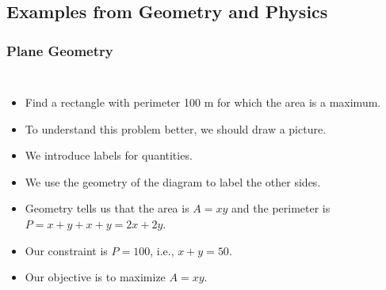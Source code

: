 \documentclass[serif,ignorenonframetext]{beamer}
\begin{document}
\subsection{Examples from Geometry and Physics}

\begin{frame}
  \frametitle{Plane Geometry}
  \begin{columns}
  \begin{itemize}[<+->]
  \item Find a rectangle with perimeter 100 m for which the area is 
    a maximum.
  \item To understand this problem better, we should draw a picture.
  \item We introduce labels for quantities.
  \item We use the geometry of the diagram to label the other sides.
  \item Geometry tells us that the area is
    $A=xy$ and the perimeter is $P=x+y+x+y=2x+2y$.
  \item Our constraint is $P=100$, i.e., $x+y=50$.
  \item Our objective is to maximize $A=xy$.
  \end{itemize}

\end{columns}
\end{frame}
\end{document}

